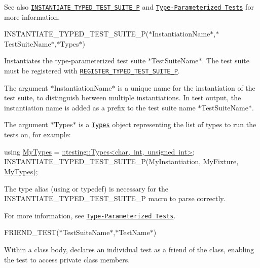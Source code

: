 See also \href{#INSTANTIATE_TYPED_TEST_SUITE_P}{\tt {\ttfamily I\+N\+S\+T\+A\+N\+T\+I\+A\+T\+E\+\_\+\+T\+Y\+P\+E\+D\+\_\+\+T\+E\+S\+T\+\_\+\+S\+U\+I\+T\+E\+\_\+P}} and \href{../advanced.md#type-parameterized-tests}{\tt Type-\/\+Parameterized Tests} for more information.

{\ttfamily I\+N\+S\+T\+A\+N\+T\+I\+A\+T\+E\+\_\+\+T\+Y\+P\+E\+D\+\_\+\+T\+E\+S\+T\+\_\+\+S\+U\+I\+T\+E\+\_\+P(}$\ast${\ttfamily Instantiation\+Name}$\ast${\ttfamily ,}$\ast${\ttfamily Test\+Suite\+Name}$\ast${\ttfamily ,}$\ast${\ttfamily Types}$\ast${\ttfamily )}

Instantiates the type-\/parameterized test suite $\ast${\ttfamily Test\+Suite\+Name}$\ast$. The test suite must be registered with \href{#REGISTER_TYPED_TEST_SUITE_P}{\tt {\ttfamily R\+E\+G\+I\+S\+T\+E\+R\+\_\+\+T\+Y\+P\+E\+D\+\_\+\+T\+E\+S\+T\+\_\+\+S\+U\+I\+T\+E\+\_\+P}}.

The argument $\ast${\ttfamily Instantiation\+Name}$\ast$ is a unique name for the instantiation of the test suite, to distinguish between multiple instantiations. In test output, the instantiation name is added as a prefix to the test suite name $\ast${\ttfamily Test\+Suite\+Name}$\ast$.

The argument $\ast${\ttfamily Types}$\ast$ is a \href{#Types}{\tt {\ttfamily Types}} object representing the list of types to run the tests on, for example\+:


\begin{DoxyCode}
\textcolor{keyword}{using} \mbox{\hyperlink{structtesting_1_1internal_1_1ProxyTypeList}{MyTypes}} = \mbox{\hyperlink{structtesting_1_1internal_1_1ProxyTypeList}{::testing::Types<char, int, unsigned int>}};
INSTANTIATE\_TYPED\_TEST\_SUITE\_P(MyInstantiation, MyFixture, \mbox{\hyperlink{structtesting_1_1internal_1_1ProxyTypeList}{MyTypes}});
\end{DoxyCode}


The type alias ({\ttfamily using} or {\ttfamily typedef}) is necessary for the {\ttfamily I\+N\+S\+T\+A\+N\+T\+I\+A\+T\+E\+\_\+\+T\+Y\+P\+E\+D\+\_\+\+T\+E\+S\+T\+\_\+\+S\+U\+I\+T\+E\+\_\+P} macro to parse correctly.

For more information, see \href{../advanced.md#type-parameterized-tests}{\tt Type-\/\+Parameterized Tests}.

{\ttfamily F\+R\+I\+E\+N\+D\+\_\+\+T\+E\+ST(}$\ast${\ttfamily Test\+Suite\+Name}$\ast${\ttfamily ,}$\ast${\ttfamily Test\+Name}$\ast${\ttfamily )}

Within a class body, declares an individual test as a friend of the class, enabling the test to access private class members.

